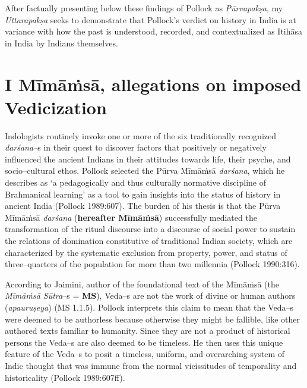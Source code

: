 After factually presenting below these findings of Pollock as \textit{Pūrvapakṣa}, my \textit{Uttarapakṣa} seeks to demonstrate that Pollock’s verdict on history in India is at variance with how the past is understood, recorded, and contextualized as Itihāsa in India by Indians themselves.


\section*{I Mīmāṁsā, allegations on imposed Vedicization}

Indologists routinely invoke one or more of the six traditionally recognized \textit{darśana–}s in their quest to discover factors that positively or negatively influenced the ancient Indians in their attitudes towards life, their psyche, and socio–cultural ethos. Pollock selected the Pūrva Mīmāṁsā \textit{darśana}, which he describes as ‘a pedagogically and thus culturally normative discipline of Brahmanical learning’ as a tool to gain insights into the status of history in ancient India (Pollock 1989:607). The burden of his thesis is that the Pūrva Mīmāṁsā \textit{darśana} (\textbf{hereafter Mīmāṁsā}) successfully mediated the transformation of the ritual discourse into a discourse of social power to sustain the relations of domination constitutive of traditional Indian society, which are characterized by the systematic exclusion from property, power, and status of three–quarters of the population for more than two millennia (Pollock 1990:316).

According to Jaimini, author of the foundational text of the Mīmāṁsā (the \textit{Mīmāṁsā Sūtra}–s = \textbf{MS}), Veda–s are not the work of divine or human authors (\textit{apauruṣeya}) (MS 1.1.5). Pollock interprets this claim to mean that the Veda–s were deemed to be authorless because otherwise they might be fallible, like other authored texts familiar to humanity. Since they are not a product of historical persons the Veda–s are also deemed to be timeless. He then uses this unique feature of the Veda–s to posit a timeless, uniform, and overarching system of Indic thought that was immune from the normal vicissitudes of temporality and historicality (Pollock 1989:607ff).

